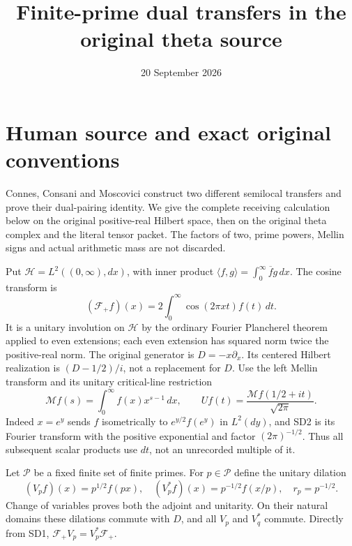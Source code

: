 \documentclass[11pt]{article}
\title{Finite-prime dual transfers in the original theta source}
\author{}\date{20 September 2026}
\newcommand{\M}{\mathcal M}
\newcommand{\F}{\mathcal F_+}
\begin{document}
\maketitle

\section{Human source and exact original conventions}
Connes, Consani and Moscovici \cite[Propositions groundstate,
sonintensor and groundstatedual; Theorem isosonin]{CCM} construct two
different semilocal transfers and prove their dual-pairing identity.
We give the complete receiving calculation below on the original
positive-real Hilbert space, then on the original theta complex and
the literal tensor packet. The factors of two, prime powers, Mellin
signs and actual arithmetic mass are not discarded.

Put $\mathcal H=L^2((0,\infty),dx)$, with inner product
$\langle f,g\rangle=\int_0^\infty\overline f g\,dx$.
The cosine transform is
\[
 (\F f)(x)=2\int_0^\infty\cos(2\pi xt)f(t)\,dt.
                                                               \tag{SD1}
\]
It is a unitary involution on $\mathcal H$ by the ordinary Fourier
Plancherel theorem applied to even extensions; each even extension
has squared norm twice the positive-real norm. The original generator
is $D=-x\partial_x$. Its centered Hilbert realization is
$(D-1/2)/i$, not a replacement for $D$.
Use the left Mellin transform and its unitary critical-line restriction
\[
 \M f(s)=\int_0^\infty f(x)x^{s-1}\,dx,\qquad
 Uf(t)=\frac{\M f(1/2+it)}{\sqrt{2\pi}}.                       \tag{SD2}
\]
Indeed $x=e^y$ sends $f$ isometrically to $e^{y/2}f(e^y)$ in
$L^2(dy)$, and SD2 is its Fourier transform with the positive
exponential and factor $(2\pi)^{-1/2}$. Thus all subsequent scalar
products use $dt$, not an unrecorded multiple of it.

Let $\mathcal P$ be a fixed finite set of finite primes. For $p\in
\mathcal P$ define the unitary dilation
\[
 (V_pf)(x)=p^{1/2}f(px),\quad
 (V_p^*f)(x)=p^{-1/2}f(x/p),\quad r_p=p^{-1/2}.
                                                               \tag{SD3}
\]
Change of variables proves both the adjoint and unitarity. On their
natural domains these dilations commute with $D$, and all $V_p$ and
$V_q^*$ commute. Directly from SD1, $\F V_p=V_p^*\F$.
\end{document}
